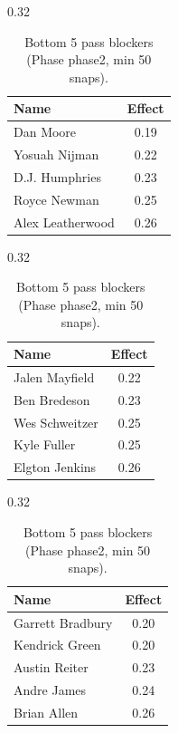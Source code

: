 \begin{table}[h!]
\centering
\begin{subtable}{0.32\textwidth}
\centering
\footnotesize
\begin{tabular}{lc}
\toprule
Name & Effect \\
\midrule
Dan Moore & 0.19 \\
Yosuah Nijman & 0.22 \\
D.J. Humphries & 0.23 \\
Royce Newman & 0.25 \\
Alex Leatherwood & 0.26 \\
\bottomrule
\end{tabular}
\caption{T}
\end{subtable}
\hfill
\begin{subtable}{0.32\textwidth}
\centering
\footnotesize
\begin{tabular}{lc}
\toprule
Name & Effect \\
\midrule
Jalen Mayfield & 0.22 \\
Ben Bredeson & 0.23 \\
Wes Schweitzer & 0.25 \\
Kyle Fuller & 0.25 \\
Elgton Jenkins & 0.26 \\
\bottomrule
\end{tabular}
\caption{G}
\end{subtable}
\hfill
\begin{subtable}{0.32\textwidth}
\centering
\footnotesize
\begin{tabular}{lc}
\toprule
Name & Effect \\
\midrule
Garrett Bradbury & 0.20 \\
Kendrick Green & 0.20 \\
Austin Reiter & 0.23 \\
Andre James & 0.24 \\
Brian Allen & 0.26 \\
\bottomrule
\end{tabular}
\caption{C}
\end{subtable}
\caption{Bottom 5 pass blockers (Phase phase2, min 50 snaps).}
\label{tab:blocker_pm_phase2_bot}
\end{table}
